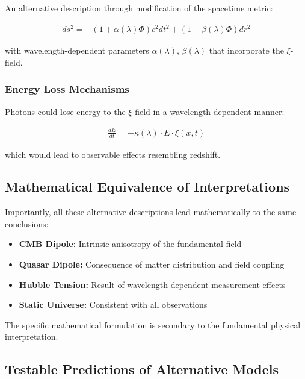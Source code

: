 \documentclass{article}
\begin{document}
	An alternative description through modification of the spacetime metric:
	
	\begin{align}
		ds^2 = -\left(1 + \alpha(\lambda)\Phi\right)c^2dt^2 + \left(1 - \beta(\lambda)\Phi\right)dr^2
	\end{align}
	
	with wavelength-dependent parameters $\alpha(\lambda)$, $\beta(\lambda)$ that incorporate the $\xi$-field.
	
	\subsubsection{Energy Loss Mechanisms}
	
	Photons could lose energy to the $\xi$-field in a wavelength-dependent manner:
	
	\begin{align}
		\frac{dE}{dt} = -\kappa(\lambda) \cdot E \cdot \xi(x,t)
	\end{align}
	
	which would lead to observable effects resembling redshift.
	
	\subsection{Mathematical Equivalence of Interpretations}
	
	Importantly, all these alternative descriptions lead mathematically to the same conclusions:
	
	\begin{itemize}
		\item \textbf{CMB Dipole:} Intrinsic anisotropy of the fundamental field
		\item \textbf{Quasar Dipole:} Consequence of matter distribution and field coupling  
		\item \textbf{Hubble Tension:} Result of wavelength-dependent measurement effects
		\item \textbf{Static Universe:} Consistent with all observations
	\end{itemize}
	
	The specific mathematical formulation is secondary to the fundamental physical interpretation.
	
	\subsection{Testable Predictions of Alternative Models}
	
\end{document}

